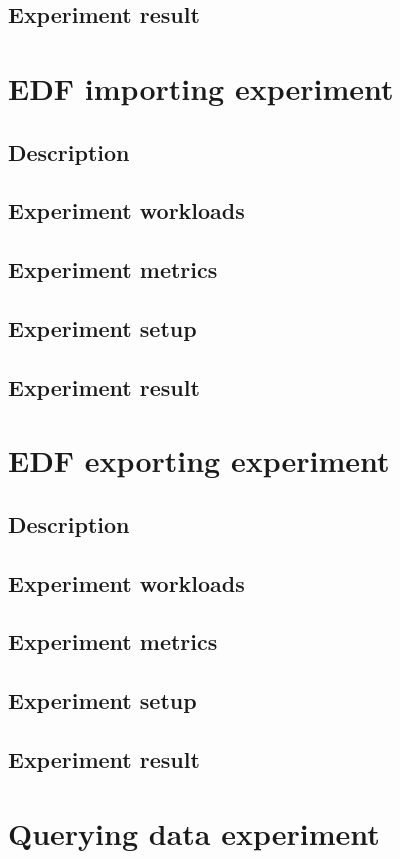 \subsection{Experiment result}
\section{EDF importing experiment}
\subsection{Description}
\subsection{Experiment workloads}
\subsection{Experiment metrics}
\subsection{Experiment setup}
\subsection{Experiment result}
\section{EDF exporting experiment}
\subsection{Description}
\subsection{Experiment workloads}
\subsection{Experiment metrics}
\subsection{Experiment setup}
\subsection{Experiment result}
\section{Querying data experiment}
